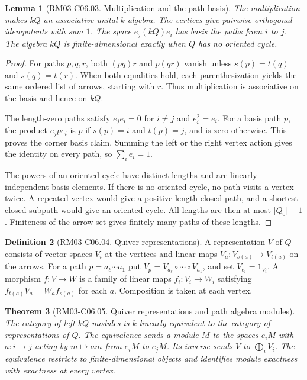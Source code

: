 \documentclass[11pt,oneside,openany]{book}
\newtheorem{theorem}{Theorem}[chapter]
\newtheorem{lemma}[theorem]{Lemma}
\theoremstyle{definition}
\newtheorem{definition}[theorem]{Definition}
\theoremstyle{remark}
\begin{document}
\begin{lemma}[RM03-C06.03. Multiplication and the path basis]
\label{lem:rm03-path-basis}
The multiplication makes \(kQ\) an associative unital \(k\)-algebra.
The vertices give pairwise orthogonal idempotents with sum \(1\).
The space \(e_j(kQ)e_i\) has basis the paths from \(i\) to \(j\).
The algebra \(kQ\) is finite-dimensional exactly when \(Q\) has no
oriented cycle.
\end{lemma}

\begin{proof}
For paths \(p,q,r\), both \((pq)r\) and \(p(qr)\) vanish unless
\(s(p)=t(q)\) and \(s(q)=t(r)\). When both equalities hold, each
parenthesization yields the same ordered list of arrows, starting
with \(r\). Thus multiplication is associative on the basis and
hence on \(kQ\).

The length-zero paths satisfy \(e_j e_i=0\) for \(i\ne j\) and
\(e_i^2=e_i\). For a basis path \(p\), the product
\(e_j p e_i\) is \(p\) if \(s(p)=i\) and \(t(p)=j\), and is zero
otherwise. This proves the corner basis claim. Summing the left or
the right vertex action gives the identity on every path, so
\(\sum_i e_i=1\).

The powers of an oriented cycle have distinct lengths and are
linearly independent basis elements. If there is no oriented cycle,
no path visits a vertex twice. A repeated vertex would give a
positive-length closed path, and a shortest closed subpath would
give an oriented cycle. All lengths are then at most
\(\lvert Q_0\rvert-1\). Finiteness of the arrow set gives finitely
many paths of these lengths.
\end{proof}

\begin{definition}[RM03-C06.04. Quiver representations]
\label{def:rm03-quiver-representations}
A representation \(V\) of \(Q\) consists of vector spaces \(V_i\)
at the vertices and linear maps \(V_a\colon V_{s(a)}\to V_{t(a)}\)
on the arrows. For a path \(p=a_\ell\cdots a_1\) put
\(V_p=V_{a_\ell}\circ\cdots\circ V_{a_1}\), and set
\(V_{e_i}=1_{V_i}\). A morphism \(f\colon V\to W\) is a family of
linear maps \(f_i\colon V_i\to W_i\) satisfying
\(f_{t(a)}V_a=W_a f_{s(a)}\) for each \(a\). Composition is taken
at each vertex.
\end{definition}

\begin{theorem}[RM03-C06.05. Quiver representations and path algebra modules]
\label{thm:rm03-quiver-equivalence}
The category of left \(kQ\)-modules is \(k\)-linearly equivalent to
the category of representations of \(Q\). The equivalence sends a
module \(M\) to the spaces \(e_iM\) with \(a\colon i\to j\) acting
by \(m\mapsto am\) from \(e_iM\) to \(e_jM\). Its inverse sends
\(V\) to \(\bigoplus_i V_i\). The equivalence restricts to
finite-dimensional objects and identifies module exactness with
exactness at every vertex.
\end{theorem}
\end{document}
